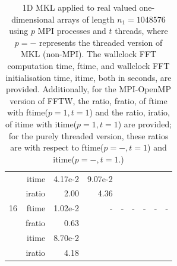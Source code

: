 \documentclass[a4]{article}
\begin{document}
\begin{table}
\begin{center}
\begin{tabular}{|r|r|r|r|r|r|r|r|r|}
      & itime &   4.17e-2 &   9.07e-2 &         & & & & \\
      & iratio &  2.00 &   4.36 &         & & & & \\ \hline
    16 & ftime  &  1.02e-2 &       - & - & - & - & - & - \\ 
     & fratio &  0.63 &        &  &  &  &  &  \\
      & itime &   8.70e-2 &       & & & & & \\
      & iratio &   4.18 &      & & & & & \\ \hline
\end{tabular}
\caption{1D MKL applied to real valued one-dimensional arrays of length $n_1=1048576$ using $p$ MPI processes and $t$ threads, where $p=-$ represents the threaded version of MKL (non-MPI). The wallclock FFT computation time, ftime, and wallclock FFT initialisation time, itime, both in seconds, are provided. Additionally, for the MPI-OpenMP version of FFTW, the ratio, fratio, of ftime  with ftime($p=1,t=1$) and the ratio, iratio, of itime  with itime($p=1,t=1$) are provided; for the purely threaded version, these ratios are with respect to ftime($p=-,t=1$) and itime($p=-,t=1$.) }\label{Tbl:MKL1d1048576}
\end{center}
\end{table}



\end{document}
